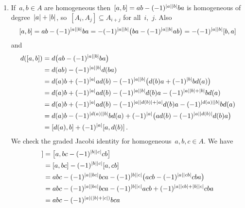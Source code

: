 \documentclass[a4paper,10pt,headings=standardclasses]{scrartcl}
\begin{document}
\begin{enumerate}
  \item
    If~$a, b \in A$ are homogeneous then~$[a,b] = ab - (-1)^{\lvert a\rvert \lvert b\rvert} ba$ is homogeneous of degree~$\lvert a\rvert + \lvert b\rvert$, so~$[A_i, A_j] \subseteq A_{i+j}$ for all~$i$,~$j$.
    Also
    \[
      [a,b]
      =
      ab - (-1)^{\lvert a\rvert \lvert b\rvert} ba
      =
      -(-1)^{\lvert a\rvert \lvert b\rvert} \bigl( ba - (-1)^{\lvert a\rvert \lvert b\rvert} ab \bigr)
      =
      -(-1)^{\lvert a\rvert \lvert b\rvert} [b,a]
    \]
    and
    \begingroup
    \allowdisplaybreaks
    \begin{align*}
      d([a,b])
      &=
      d\bigl( ab - (-1)^{\lvert a\rvert \lvert b\rvert} ba \bigr)
      \\
      &=
      d(ab) - (-1)^{\lvert a\rvert \lvert b\rvert} d(ba)
      \\
      &=
        d(a) b
      + (-1)^{\lvert a\rvert} a d(b)
      - (-1)^{\lvert a\rvert \lvert b\rvert} \bigl( d(b) a + (-1)^{\lvert b\rvert} b d(a) \bigr)
      \\
      &=
        d(a) b
      + (-1)^{\lvert a\rvert} a d(b)
      - (-1)^{\lvert a\rvert \lvert b\rvert} d(b) a
      - (-1)^{\lvert a\rvert \lvert b\rvert + \lvert b\rvert} b d(a)
      \\
      &=
        d(a) b
      + (-1)^{\lvert a\rvert} a d(b)
      - (-1)^{\lvert a\rvert \lvert d(b)\rvert + \lvert a\rvert} d(b) a
      - (-1)^{\lvert d(a)\rvert \lvert b\rvert} b d(a)
      \\
      &=
        d(a) b - (-1)^{\lvert d(a)\rvert \lvert b\rvert} b d(a)
      + (-1)^{\lvert a\rvert} \bigl( a d(b) - (-1)^{\lvert a\rvert \lvert d(b)\rvert} d(b) a \bigr)
      \\
      &=
      [d(a), b] + (-1)^{\lvert a\rvert} [a, d(b)] \,.
    \end{align*}
    \endgroup
    We check the graded Jacobi identity for homogeneous~$a, b, c \in A$.
    We have
    \begingroup
    \allowdisplaybreaks
    \begin{align*}
      [a,[b,c]]
      &=
      \bigl[ a, bc - (-1)^{\hdeg{b} \hdeg{c}} cb \bigr]
      \\
      &=
      [a, bc] - (-1)^{\hdeg{b} \hdeg{c}} [a, cb]
      \\
      &=
        abc - (-1)^{\hdeg{a} \hdeg{bc}} bca
      - (-1)^{\hdeg{b} \hdeg{c}} \bigl( acb - (-1)^{\hdeg{a} \hdeg{cb}} cba \bigr)
      \\
      &=
        abc
      - (-1)^{\hdeg{a} \hdeg{bc}} bca
      - (-1)^{\hdeg{b} \hdeg{c}} acb
      + (-1)^{\hdeg{a} \hdeg{cb} + \hdeg{b} \hdeg{c}} cba
      \\
      &=
        abc
      - (-1)^{\hdeg{a} (\hdeg{b} + \hdeg{c})} bca

\end{align*}
\end{enumerate}
\end{document}
